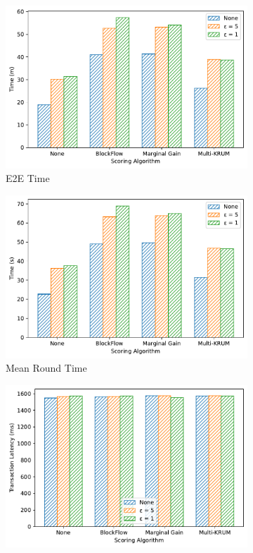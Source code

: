 \begin{figure}[!hpt]
    \centering
    \begin{subfigure}[b]{0.47\textwidth}
        \centering
        \includegraphics[width=\textwidth]{graphics/privacy/e2e.pdf}
        \caption{E2E Time}
    \end{subfigure}
    \hfill
    \begin{subfigure}[b]{0.47\textwidth}
        \centering
        \includegraphics[width=\textwidth]{graphics/privacy/round.pdf}
        \caption{Mean Round Time}
    \end{subfigure}
    \hfill
    \begin{subfigure}[b]{0.47\textwidth}
        \centering
        \includegraphics[width=\textwidth]{graphics/privacy/tx_latency.pdf}

\end{subfigure}
\end{figure}
